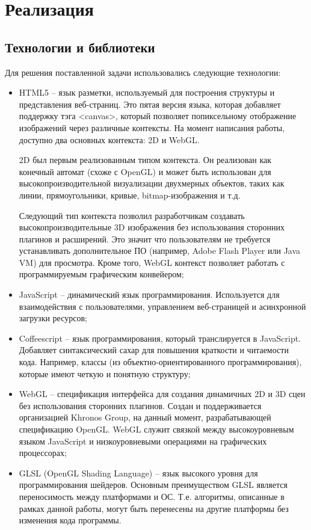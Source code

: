 \newpage
\section{Реализация} 

\subsection{Технологии и библиотеки} 

Для решения поставленной задачи использовались следующие технологии:

\begin{itemize} 
  \item HTML5 -- язык разметки, используемый для построения структуры и представления веб-страниц. 
    Это пятая версия языка, которая добавляет поддержку тэга \textless{}canvas\textgreater{}, 
    который позволяет попиксельному отображение изображений через различные контексты. 
    На момент написания работы, доступно два основных контекста: 2D и WebGL.

    2D был первым реализованным типом контекста. Он реализован как конечный автомат (схоже 
    с OpenGL) и может быть использован для высокопроизводительной визуализации двухмерных объектов, 
    таких как линии, прямоугольники, кривые, bitmap-изображения и т.д.

    Следующий тип контекста позволил разработчикам создавать высокопроизводительные 3D изображения 
    без использования сторонних плагинов и расширений. Это значит что пользователям не требуется 
    устанавливать дополнительное ПО (например, Adobe Flash Player или Java VM) для просмотра. 
    Кроме того, WebGL контекст позволяет работать с программируемым графическим конвейером;

  \item JavaScript -- динамический язык программирования. Используется для взаимодействия с 
    пользователями, управлением веб-страницей и асинхронной загрузки ресурсов;

  \item Coffeescript -- язык программирования, который транслируется в JavaScript. Добавляет 
    синтаксический сахар для повышения краткости и читаемости кода. Например, классы 
    (из объектно-ориентированного программирования), которые имеют четкую и понятную структуру;

  \item WebGL -- спецификация интерфейса для создания динамичных 2D и 3D сцен без использования 
    сторонних плагинов. Создан и поддерживается организацией Khronos Group, на данный момент, 
    разрабатывающей спецификацию OpenGL. WebGL служит связкой между высокоуровневым языком 
    JavaScript и низкоуровневыми операциями на графических процессорах;

  \item GLSL (OpenGL Shading Language) -- язык высокого уровня для программирования шейдеров. 
    Основным преимуществом GLSL является переносимость между платформами и ОС. Т.е. алгоритмы, 
    описанные в рамках данной работы, могут быть перенесены на другие платформы без изменения 
    кода программы.
\end{itemize}


